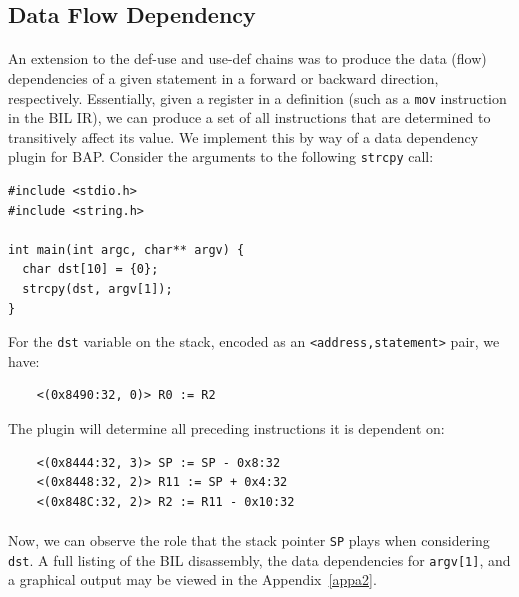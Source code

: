 \documentclass[letterpaper,11pt]{article}
\begin{document}
\subsection{Data Flow Dependency}

\paragraph{}
An extension to the def-use and use-def chains was to produce the data (flow)
dependencies of a given statement in a forward or backward direction,
respectively. Essentially, given a register in a definition (such as a \texttt{mov}
instruction in the BIL IR), we can produce a set of all instructions that are
determined to transitively affect its value. We implement this
by way of a data dependency plugin for BAP. Consider the arguments to the
following \texttt{strcpy} call:

\begin{center}
\lstset{language=C, label=strcpy_src,
caption=strcpy.c, breaklines=true, basicstyle=\tiny, numbers=none}
\begin{lstlisting}
#include <stdio.h>
#include <string.h>

int main(int argc, char** argv) {
  char dst[10] = {0};
  strcpy(dst, argv[1]);
}
\end{lstlisting}
\end{center}

For the \texttt{dst} variable on the stack, encoded as an
\texttt{<address,statement>} pair, we have:

\tiny
\begin{verbatim}
    <(0x8490:32, 0)> R0 := R2
\end{verbatim}
\normalsize

The plugin will determine all preceding instructions it is dependent on:

\tiny
\begin{verbatim}
    <(0x8444:32, 3)> SP := SP - 0x8:32
    <(0x8448:32, 2)> R11 := SP + 0x4:32
    <(0x848C:32, 2)> R2 := R11 - 0x10:32
\end{verbatim}
\normalsize

\paragraph{}
Now, we can observe the role that the stack pointer \texttt{SP} plays
when considering \texttt{dst}. A full listing of the BIL disassembly,
the data dependencies for \texttt{argv[1]}, and a graphical
output may be viewed in the Appendix~\ref{appa2}.
\end{document}
